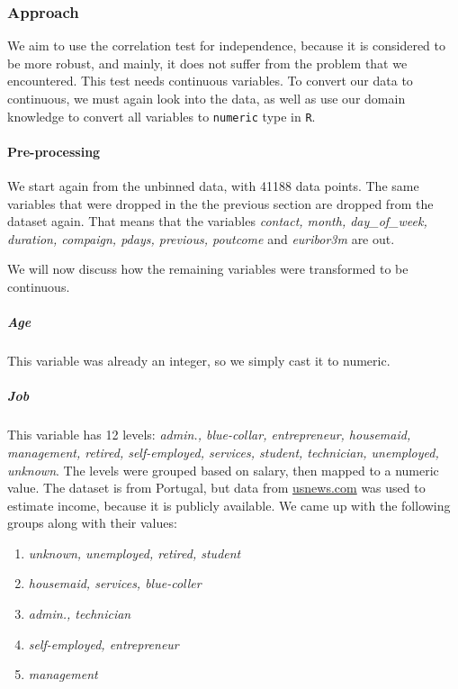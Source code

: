 \documentclass[11pt,]{article}
\providecommand{\tightlist}{%
  \setlength{\itemsep}{0pt}\setlength{\parskip}{0pt}}
\let\oldparagraph\paragraph
\renewcommand{\paragraph}[1]{\oldparagraph{#1}\mbox{}}
\let\oldsubparagraph\subparagraph
\renewcommand{\subparagraph}[1]{\oldsubparagraph{#1}\mbox{}}
\begin{document}
\begin{multicols}{2}
\hypertarget{approach-1}{%
\subsubsection{Approach}\label{approach-1}}

We aim to use the correlation test for independence, because it is
considered to be more robust, and mainly, it does not suffer from the
problem that we encountered. This test needs continuous variables. To
convert our data to continuous, we must again look into the data, as
well as use our domain knowledge to convert all variables to
\texttt{numeric} type in \texttt{R}.

\hypertarget{pre-processing}{%
\paragraph{Pre-processing}\label{pre-processing}}

We start again from the unbinned data, with 41188 data points. The same
variables that were dropped in the the previous section are dropped from
the dataset again. That means that the variables \emph{contact, month,
day\_of\_week, duration, compaign, pdays, previous, poutcome} and
\emph{euribor3m} are out.

We will now discuss how the remaining variables were transformed to be
continuous.

\hypertarget{age-1}{%
\subparagraph{Age}\label{age-1}}

This variable was already an integer, so we simply cast it to numeric.

\hypertarget{job}{%
\subparagraph{Job}\label{job}}

This variable has 12 levels: \emph{admin., blue-collar, entrepreneur,
housemaid, management, retired, self-employed, services, student,
technician, unemployed, unknown}. The levels were grouped based on
salary, then mapped to a numeric value. The dataset is from Portugal,
but data from \href{https://money.usnews.com/}{usnews.com} was used to
estimate income, because it is publicly available. We came up with the
following groups along with their values:

\begin{enumerate}
\def\labelenumi{\arabic{enumi}.}
\tightlist
\item
  \emph{unknown, unemployed, retired, student}
\item
  \emph{housemaid, services, blue-coller}
\item
  \emph{admin., technician}
\item
  \emph{self-employed, entrepreneur}
\item
  \emph{management}
\end{enumerate}


\end{multicols}
\end{document}
